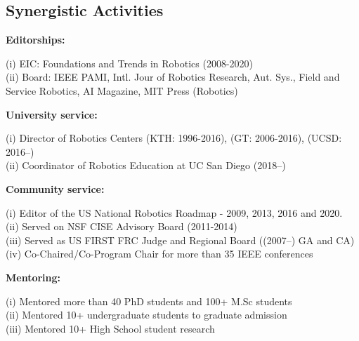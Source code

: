 \documentclass[svgnames,11pt]{article}
\begin{document}
\subsection{Synergistic Activities}

\begin{bibenum}[itemsep=4pt]
  
   \item \textbf{Editorships:}
  
  (i) EIC: Foundations and Trends in Robotics (2008-2020)\\
  (ii) Board: IEEE PAMI, Intl. Jour of Robotics Research, Aut. Sys.,
       Field and Service Robotics, AI Magazine, MIT Press (Robotics)
      
  \item \textbf{University service:}
      
    (i) Director of Robotics Centers (KTH: 1996-2016), (GT: 2006-2016), (UCSD: 2016--)\\
    (ii) Coordinator of Robotics Education at UC San Diego (2018--)

    \item \textbf{Community service:}
      
      (i) Editor of the US National Robotics Roadmap - 2009, 2013, 2016 and 2020.\\
      (ii) Served on NSF CISE Advisory Board (2011-2014)\\
      (iii) Served as US FIRST FRC Judge and Regional Board ((2007--) GA and CA)  \\
      (iv)  Co-Chaired/Co-Program Chair for more than 35 IEEE conferences
    \item \textbf{Mentoring:}
      
      (i) Mentored more than 40 PhD students and 100+ M.Sc students\\
      (ii) Mentored 10+ undergraduate students to graduate admission\\
      (iii) Mentored 10+ High School student research 

\end{bibenum}
\end{document}
